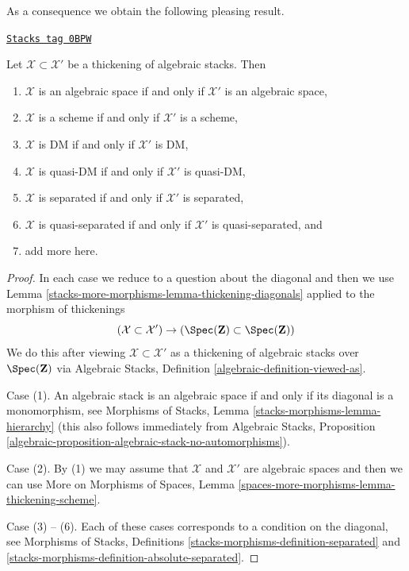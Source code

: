 As a consequence we obtain the following pleasing result.

\begin{lemma}
\label{stacks-more-morphisms-lemma-thickening-properties}
\href{https://stacks.math.columbia.edu/tag/0BPW}{\texttt{Stacks tag 0BPW}}

\begin{reference}
\cite[Theorem 2.2.5]{Conrad-moduli}
\end{reference}
Let $\mathcal{X} \subset \mathcal{X}'$ be a thickening of algebraic
stacks. Then
\begin{enumerate}
\item $\mathcal{X}$ is an algebraic space if and only if $\mathcal{X}'$
is an algebraic space,
\item $\mathcal{X}$ is a scheme if and only if $\mathcal{X}'$ is a scheme,
\item $\mathcal{X}$ is DM if and only if $\mathcal{X}'$ is DM,
\item $\mathcal{X}$ is quasi-DM if and only if $\mathcal{X}'$ is quasi-DM,
\item $\mathcal{X}$ is separated if and only if $\mathcal{X}'$ is separated,
\item $\mathcal{X}$ is quasi-separated if and only if $\mathcal{X}'$ is
quasi-separated, and
\item add more here.
\end{enumerate}
\end{lemma}

\begin{proof}
In each case we reduce to a question about the diagonal and then
we use Lemma \ref{stacks-more-morphisms-lemma-thickening-diagonals} applied to the
morphism of thickenings
$$
(\mathcal{X} \subset \mathcal{X}') \to
\left(\Spec(\mathbf{Z}) \subset \Spec(\mathbf{Z})\right)
$$
We do this after viewing
$\mathcal{X} \subset \mathcal{X}'$ as a thickening of algebraic stacks
over $\Spec(\mathbf{Z})$ via
Algebraic Stacks, Definition \ref{algebraic-definition-viewed-as}.

\medskip\noindent
Case (1). An algebraic stack is an algebraic space if and only if its
diagonal is a monomorphism, see
Morphisms of Stacks, Lemma \ref{stacks-morphisms-lemma-hierarchy}
(this also follows immediately from Algebraic Stacks,
Proposition \ref{algebraic-proposition-algebraic-stack-no-automorphisms}).

\medskip\noindent
Case (2). By (1) we may assume that $\mathcal{X}$ and $\mathcal{X}'$
are algebraic spaces and then we can use
More on Morphisms of Spaces, Lemma
\ref{spaces-more-morphisms-lemma-thickening-scheme}.

\medskip\noindent
Case (3) -- (6). Each of these cases corresponds to a condition
on the diagonal, see Morphisms of Stacks, Definitions
\ref{stacks-morphisms-definition-separated} and
\ref{stacks-morphisms-definition-absolute-separated}.
\end{proof}

